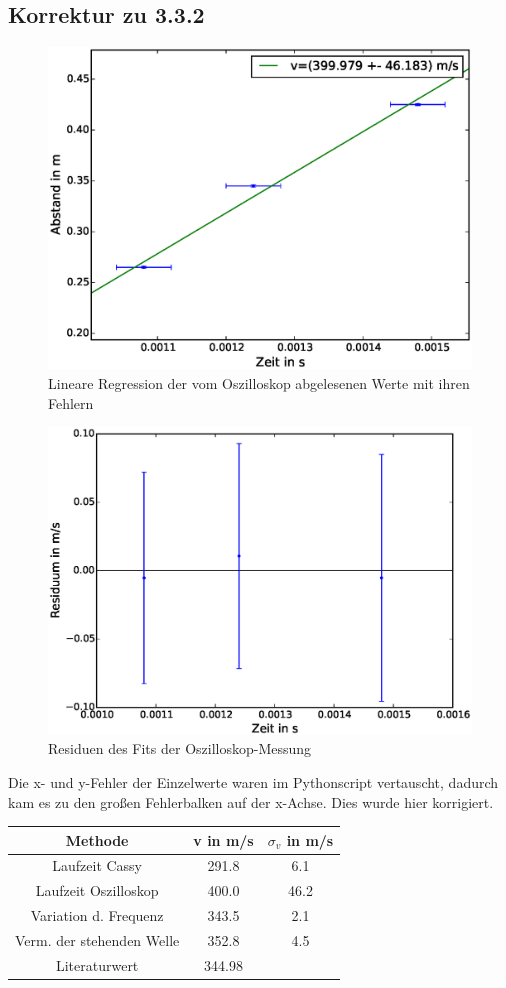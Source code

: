 \documentclass[12pt,a4paper]{article}
\begin{document}
\subsection{Korrektur zu 3.3.2}
\begin{figure}[H]
\centering
\includegraphics[scale=0.7]{Bilder/linreg-oszi-laufzeit.eps}
\caption{Lineare Regression der vom Oszilloskop abgelesenen Werte mit ihren Fehlern}
\end{figure}
\begin{figure}[H]
\centering
\includegraphics[scale=0.7]{Bilder/residuum-oszi-laufzeit.eps}
\caption{Residuen des Fits der Oszilloskop-Messung}
\end{figure}
Die x- und y-Fehler der Einzelwerte waren im Pythonscript vertauscht, dadurch kam es zu den großen Fehlerbalken auf der x-Achse. Dies wurde hier korrigiert.
\centering
\begin{tabular}{|c|c|c|}
\hline 
Methode & v in m/s & $\sigma_v$ in m/s \\ 
\hline 
Laufzeit Cassy & 291.8 & 6.1 \\ 
\hline 
Laufzeit Oszilloskop & 400.0 & 46.2 \\ 
\hline 
Variation d. Frequenz & 343.5 & 2.1 \\ 
\hline 
Verm. der stehenden Welle & 352.8 & 4.5 \\ 
\hline 
Literaturwert & 344.98 &  \\ 
\hline 
\end{tabular} 
\end{document}
